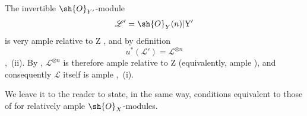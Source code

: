 \begin{corollary}[18.12.17]
The invertible $\sh{O}_{Y'}$-module
\[
  \mathscr{L}'=\sh{O}_Y(n)|\mathrm{Y}'
\]
is very ample relative to $\mathrm{Z}$ , and by definition
\[
  u^*(\mathscr{L}')=\mathscr{L}^{\otimes n}
\]
,~(ii). By , $\mathscr{L}^{\otimes n}$ is therefore ample relative to $\mathrm{Z}$ (equivalently, ample ), and consequently $\mathscr{L}$ itself is ample ,~(i).

We leave it to the reader to state, in the same way, conditions equivalent to those of  for relatively ample $\sh{O}_X$-modules.
\end{corollary}
